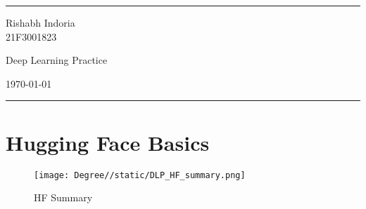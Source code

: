 \documentclass[a4paper]{article}
\begin{document}
\fancyhead[c]{}
\hrule \medskip
\begin{minipage}{0.195\textwidth}
\raggedright
Rishabh Indoria\\
21F3001823
\end{minipage}
\begin{minipage}{0.6\textwidth}
\centering
\LARGE
Deep Learning Practice
\end{minipage}
\begin{minipage}{0.195\textwidth}
\raggedleft
\today \hfill \\
\end{minipage}
\medskip \hrule
\bigskip

\section{Hugging Face Basics}
\begin{figure}[H]
    \centering
    \texttt{[image: Degree//static/DLP\_HF\_summary.png]}
    \caption{HF Summary}
\end{figure}
\end{document}
